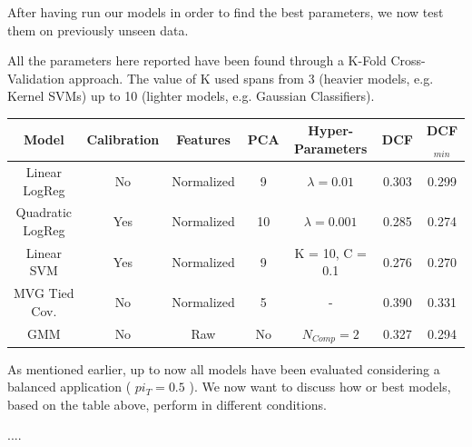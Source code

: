 \documentclass[12pt, twocolumn]{article}
\begin{document}
After having run our models in order to find the best parameters, we now test them on previously unseen data.

All the parameters here reported have been found through a K-Fold Cross-Validation approach.
The value of K used spans from 3 (heavier models, e.g. Kernel SVMs) up to 10 (lighter models, e.g. Gaussian Classifiers).

\begin{table}[t] 
    \centering
    \begin{tabular}{||c|c|c|c|c|c|c||}
        \hline 
        Model & Calibration & Features & PCA & Hyper-Parameters & DCF & DCF$_{min}$ \\
        \hline
        Linear LogReg & No & Normalized & 9 & $\lambda = 0.01$ & 0.303 & 0.299 \\
        Quadratic LogReg & Yes & Normalized & 10 & $\lambda = 0.001$ & 0.285 & 0.274 \\
        Linear SVM & Yes & Normalized & 9 & K = 10, C = 0.1 & 0.276 & 0.270 \\
        MVG Tied Cov. & No & Normalized & 5 & - & 0.390 & 0.331 \\
        GMM & No & Raw & No & $N_{Comp} = 2 $ & 0.327 & 0.294 \\ 
        \hline
    \end{tabular}
\end{table}

\newpage

As mentioned earlier, up to now all models have been evaluated considering a balanced application ( $pi_T = 0.5$ ).
We now want to discuss how or best models, based on the table above, perform in different conditions.

....
\end{document}
